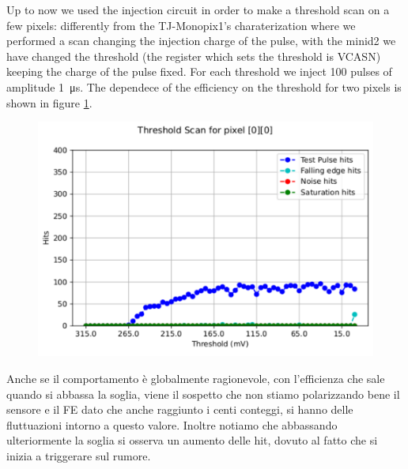     Up to now we used the injection circuit in order to make a threshold scan on a few pixels: differently from the TJ-Monopix1's charaterization where we performed a scan changing the injection charge of the pulse, with the minid2 we have changed the threshold (the register which sets the threshold is VCASN) keeping the charge of the pulse fixed.
    For each threshold we inject 100 pulses of amplitude \SI{1}{\us}. The dependece of the efficiency on the threshold for two pixels is shown in figure \ref{fig:ARCADIA_threshold}.  
    \begin{figure}[h!]
        \centering
        \includegraphics[width=.7\linewidth]{figures/charaterization/ARCADIA/threshold_0_0.pdf}
        \caption{}
        \label{fig:ARCADIA_threshold}
    \end{figure} 
    Anche se il comportamento è globalmente ragionevole, con l'efficienza che sale quando si abbassa la soglia, viene il sospetto che non stiamo polarizzando bene il sensore e il FE dato che anche raggiunto i centi conteggi, si hanno delle fluttuazioni intorno a questo valore. Inoltre notiamo che abbassando ulteriormente la soglia si osserva un aumento delle hit, dovuto al fatto che si inizia a triggerare sul rumore. 


